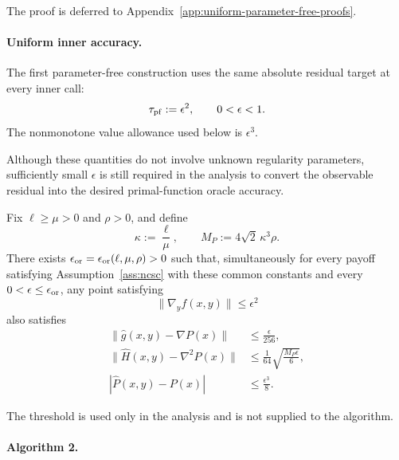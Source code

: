 The proof is deferred to
Appendix~\ref{app:uniform-parameter-free-proofs}.


\paragraph{Uniform inner accuracy.}

The first parameter-free construction uses the same absolute residual
target at every inner call:
\begin{equation}
    \tau_{\rm pf}:=\epsilon^2,
    \qquad
    0<\epsilon<1.
    \label{eq:pf-uniform-residual}
\end{equation}
The nonmonotone value allowance used below is $\epsilon^3$.

Although these quantities do not involve unknown regularity
parameters, sufficiently small $\epsilon$ is still required in the
analysis to convert the observable residual into the desired
primal-function oracle accuracy.

\begin{lemma}
\label{lem:pf-asymptotic-oracle}
Fix $\ell\ge\mu>0$ and $\rho>0$, and define
\[
    \kappa:=\frac{\ell}{\mu},
    \qquad
    M_P:=4\sqrt2\,\kappa^3\rho.
\]
There exists
$\epsilon_{\rm or}=\epsilon_{\rm or}(\ell,\mu,\rho)>0$
such that, simultaneously for every payoff satisfying
Assumption~\ref{ass:ncsc} with these common constants and every
$0<\epsilon\le\epsilon_{\rm or}$, any point satisfying
\[
    \|\nabla_yf(x,y)\|\le\epsilon^2
\]
also satisfies
\begin{subequations}
\label{eq:pf-oracle-bounds}
\begin{align}
    \|\widehat g(x,y)-\nabla P(x)\|
    &\le
    \frac{\epsilon}{256},
    \label{eq:pf-gradient-error}
    \\
    \|\widehat H(x,y)-\nabla^2P(x)\|
    &\le
    \frac1{64}
    \sqrt{\frac{M_P\epsilon}{6}},
    \label{eq:pf-hessian-error}
    \\
    |\widehat P(x,y)-P(x)|
    &\le
    \frac{\epsilon^3}{8}.
    \label{eq:pf-value-error}
\end{align}
\end{subequations}
\end{lemma}

The threshold is used only in the analysis and is not supplied to the
algorithm.


\paragraph{Algorithm 2.}

